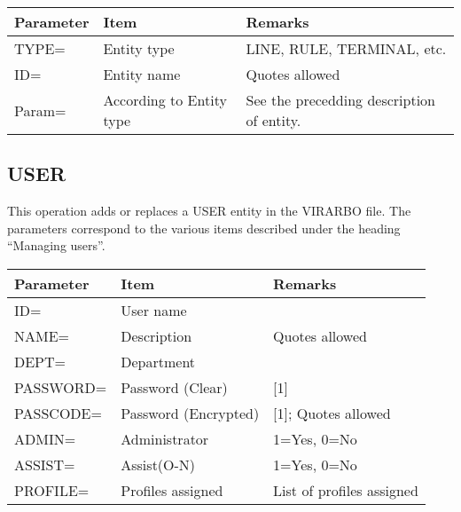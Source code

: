 \documentclass[letterpaper,10pt,english]{sphinxmanual}
\begin{document}
\begin{savenotes}\sphinxattablestart
\centering
\begin{tabulary}{\linewidth}[t]{|T|T|T|}
\hline
\sphinxstyletheadfamily 
Parameter
&\sphinxstyletheadfamily 
Item
&\sphinxstyletheadfamily 
Remarks
\\
\hline
TYPE=
&
Entity type
&
LINE, RULE, TERMINAL, etc.
\\
\hline
ID=
&
Entity name
&
Quotes allowed
\\
\hline
Param=
&
According to Entity type
&
See the precedding description of entity.
\\
\hline
\end{tabulary}
\par
\sphinxattableend\end{savenotes}

\ignorespaces 

\subsection{USER}
\label{\detokenize{Installation_Guide:user}}\label{\detokenize{Installation_Guide:index-177}}
This operation adds or replaces a USER entity in the VIRARBO file. The parameters correspond to the various items described under the heading “Managing users”.


\begin{savenotes}\sphinxattablestart
\centering
\begin{tabulary}{\linewidth}[t]{|T|T|T|}
\hline
\sphinxstyletheadfamily 
Parameter
&\sphinxstyletheadfamily 
Item
&\sphinxstyletheadfamily 
Remarks
\\
\hline
ID=
&
User name
&\\
\hline
NAME=
&
Description
&
Quotes allowed
\\
\hline
DEPT=
&
Department
&\\
\hline
PASSWORD=
&
Password (Clear)
&
{[}1{]}
\\
\hline
PASSCODE=
&
Password (Encrypted)
&
{[}1{]}; Quotes allowed
\\
\hline
ADMIN=
&
Administrator
&
1=Yes, 0=No
\\
\hline
ASSIST=
&
Assist(O-N)
&
1=Yes, 0=No
\\
\hline
PROFILE=
&
Profiles assigned
&
List of profiles assigned
\\
\hline
\end{tabulary}
\par
\sphinxattableend\end{savenotes}
\end{document}
